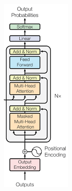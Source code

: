 \begin{figure}[h]
	\centering
	\begin{minipage}[b]{0.25\textwidth}
		\centering
		\includegraphics[width=\textwidth]{transformer_images/decoder.png}
		\caption{}
		\label{fig:Decoder}
	\end{minipage}
	\hfill
\end{figure}


